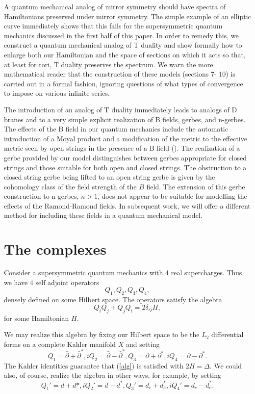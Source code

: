 \documentclass[a4paper,11pt]{amsart}
\newcommand{\db}{\bar{\partial}}
\newcommand{\p}{\partial}
\begin{document}
A quantum mechanical analog of mirror symmetry should have spectra of
Hamiltonians preserved under mirror symmetry. The simple example of an
elliptic curve immediately shows that this fails for the supersymmetric quantum 
mechanics discussed in the first half of this paper. In order to remedy this, 
we construct a quantum mechanical analog of T duality and show formally how to
 enlarge both our Hamiltonian 
and the space of sections on which it acts so that, at least for tori, 
T duality preserves the spectrum. We warn the more mathematical reader that 
the construction of these models (sections 7- 10) is carried
out in a formal fashion, ignoring questions of what types of convergence to
impose on various infinite series. 

  The introduction of an analog of T duality immediately leads to analogs of D
  branes and to a very simple explicit realization of B fields, gerbes, and
  n-gerbes. The effects of the B field in our quantum mechanics include the 
  automatic introduction of a Moyal product and a modification of the metric 
to the effective metric seen by open strings in the presence of a B
 field (\cite{SW}). The realization of a gerbe provided by our model
 distinguishes between gerbes appropriate for closed strings and those suitable
 for both open and closed strings. The obstruction to a closed string gerbe 
 being lifted to an open string gerbe is given by the cohomology class of the
 field strength of the $B$ field.
 The extension of this gerbe construction to n gerbes, $n>1$, does not appear
  to be suitable for modelling the effects of the Ramond-Ramond fields. In 
   subsequent work, we will offer a different method for including
    these fields in a quantum mechanical model.  

 
\section{The complexes}\label{ABC} 
Consider a supersymmetric quantum mechanics with 4 real supercharges. Thus we 
have 4 self adjoint operators 
$$Q_1,Q_2,Q_3,Q_4,$$ 
densely defined on some Hilbert space. The operators satisfy the algebra 
\begin{equation}\label{alg}
Q_iQ_j+Q_jQ_i = 2\delta_{ij}H,
\end{equation}
for some Hamiltonian $H$. 

We may realize this algebra by fixing our Hilbert space to be the $L_2$
differential forms on a complete Kahler manifold $X$ and setting  
$$Q_1 = \db + \db^*, iQ_2 = \db - \db^*, Q_3 = \p + \p^*, iQ_4 = \p - \p^*.$$
The Kahler identities guarantee that (\ref{alg}) is satisfied with 
$2H = \Delta$. We could also, of course,  realize the algebra in other ways, for
example, by setting 
$$Q_1'= d+d*, iQ_2' = d - d^*, Q_3' = d_c+d_c^*, iQ_4' = d_c-d_c^*.$$
\end{document}
